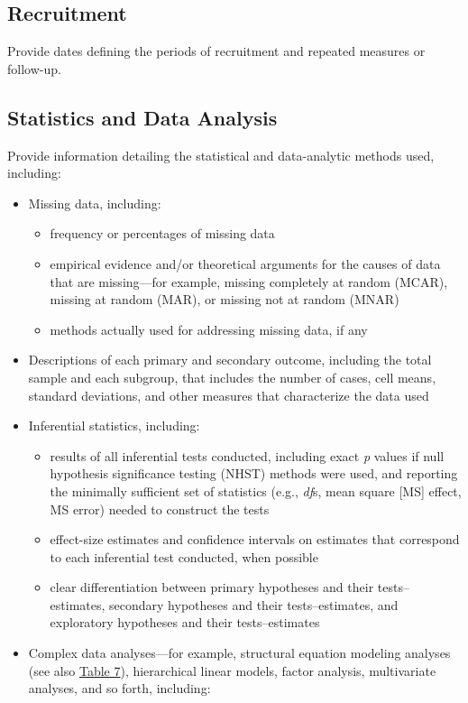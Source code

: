 \documentclass[acmsmall,screen,anonymous,review]{acmart}
\begin{document}
\subsection{Recruitment}
Provide dates defining the periods of recruitment and repeated measures or follow-up.

\subsection{Statistics and Data Analysis}
Provide information detailing the statistical and data-analytic methods used, including:

\begin{itemize}
    \item Missing data, including:
    \begin{itemize}
        \item frequency or percentages of missing data
        \item empirical evidence and/or theoretical arguments for the causes of data that are missing---for example, missing completely at random (MCAR), missing at random (MAR), or missing not at random (MNAR)
        \item methods actually used for addressing missing data, if any
    \end{itemize}
    \item Descriptions of each primary and secondary outcome, including the total sample and each subgroup, that includes the number of cases, cell means, standard deviations, and other measures that characterize the data used
    \item Inferential statistics, including:
    \begin{itemize}
        \item results of all inferential tests conducted, including exact \emph{p} values if null hypothesis significance testing (NHST) methods were used, and reporting the minimally sufficient set of statistics (e.g., \emph{df}s, mean square [MS] effect, MS error) needed to construct the tests
        \item effect-size estimates and confidence intervals on estimates that correspond to each inferential test conducted, when possible
        \item clear differentiation between primary hypotheses and their tests--estimates, secondary hypotheses and their tests--estimates, and exploratory hypotheses and their tests--estimates
    \end{itemize}
    \item Complex data analyses---for example, structural equation modeling analyses (see also \href{https://apastyle.apa.org/jars/quant-table-7.pdf}{Table 7}), hierarchical linear models, factor analysis, multivariate analyses, and so forth, including:

\end{itemize}
\end{document}
